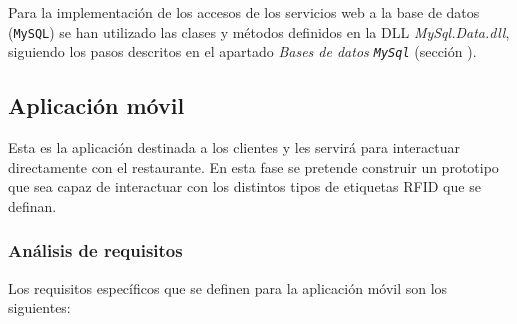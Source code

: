 Para la implementación de los accesos de los servicios web a la base de datos 
(\texttt{MySQL}) se han utilizado las clases y métodos definidos en la \acs{DLL}
\emph{MySql.Data.dll}, siguiendo los pasos descritos en el apartado
\emph{Bases de datos \texttt{MySql}} (sección \label{subsec:webServicesApp}).

\subsection{Aplicación móvil}
Esta es la aplicación destinada a los clientes y les servirá para interactuar
directamente con el restaurante. En esta fase se pretende construir un
prototipo que sea capaz de interactuar con los distintos
tipos de etiquetas \acs{RFID} que se definan.

\subsubsection{Análisis de requisitos}
Los requisitos específicos que se definen para la aplicación móvil son los
siguientes:
